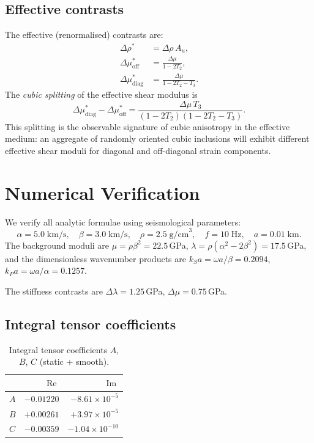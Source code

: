 \documentclass[11pt,a4paper]{article}
\newcommand{\Dlam}{\Delta\lambda}
\newcommand{\Dmu}{\Delta\mu}
\newcommand{\Drho}{\Delta\rho}
\newcommand{\re}{\operatorname{Re}}
\newcommand{\im}{\operatorname{Im}}
\begin{document}
\subsection{Effective contrasts}

The effective (renormalised) contrasts are:
\begin{align}
  \Drho^* &= \Drho\,A_u, \label{eq:Drhost} \\
  \Dmu_\text{off}^* &= \frac{\Dmu}{1 - 2T_2},
  \label{eq:Dmuoff} \\
  \Dmu_\text{diag}^* &= \frac{\Dmu}{1 - 2T_2 - T_3}.
  \label{eq:Dmudiag}
\end{align}
The \emph{cubic splitting} of the effective shear modulus is
\begin{equation}
  \boxed{
  \Dmu_\text{diag}^* - \Dmu_\text{off}^*
  = \frac{\Dmu\,T_3}{(1 - 2T_2)(1 - 2T_2 - T_3)}.
  }
  \label{eq:splitting}
\end{equation}
This splitting is the observable signature of cubic anisotropy
in the effective medium: an aggregate of randomly oriented cubic
inclusions will exhibit different effective shear moduli for
diagonal and off-diagonal strain components.

\section{Numerical Verification}
\label{sec:numerical}

We verify all analytic formulae using seismological parameters:
\begin{equation*}
  \alpha = 5.0\;\text{km/s}, \quad
  \beta = 3.0\;\text{km/s}, \quad
  \rho = 2.5\;\text{g/cm}^3, \quad
  f = 10\;\text{Hz}, \quad
  a = 0.01\;\text{km}.
\end{equation*}
The background moduli are
$\mu = \rho\beta^2 = 22.5$\,GPa,
$\lambda = \rho(\alpha^2 - 2\beta^2) = 17.5$\,GPa,
and the dimensionless wavenumber products are
$k_S a = \omega a/\beta = 0.2094$,
$k_P a = \omega a/\alpha = 0.1257$.

The stiffness contrasts are $\Dlam = 1.25$\,GPa,
$\Dmu = 0.75$\,GPa.

\subsection{Integral tensor coefficients}

\begin{table}[ht]
\centering
\caption{Integral tensor coefficients $A$, $B$, $C$ (static + smooth).}
\label{tab:ABC}
\begin{tabular}{@{}lrr@{}}
\toprule
 & $\re$ & $\im$ \\
\midrule
$A$ & $-0.01220$ & $-8.61 \times 10^{-5}$ \\
$B$ & $+0.00261$ & $+3.97 \times 10^{-5}$ \\
$C$ & $-0.00359$ & $-1.04 \times 10^{-10}$ \\
\bottomrule
\end{tabular}
\end{table}
\end{document}
